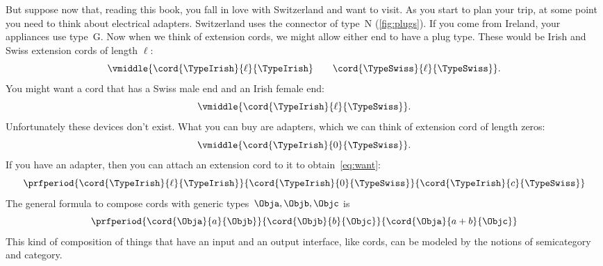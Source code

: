 But suppose now that, reading this book, you fall in love with Switzerland and want to visit.
As you start to plan your trip, at some point you need to think about electrical adapters.
Switzerland uses the connector of type~N (\cref{fig:plugs}).
If you come from Ireland, your appliances use type~G.
Now when we think of extension cords, we might allow either end to have a plug type.
%
These would be Irish and Swiss extension cords of length $\ell$:
%
\begin{equation}
    \label{eq:irish-swiss}
    \vmiddle{\cord{\TypeIrish}{\ell}{\TypeIrish} \qquad \cord{\TypeSwiss}{\ell}{\TypeSwiss}}.
\end{equation}
%
You might want a cord that has a Swiss male end and an Irish female end:
%
\begin{equation}
    \label{eq:want}
    \vmiddle{\cord{\TypeIrish}{\ell}{\TypeSwiss}}.
\end{equation}
%
Unfortunately these devices don't exist.
What you can buy are adapters, which we can think of extension cord of length zeros:
\begin{equation}
    \vmiddle{\cord{\TypeIrish}{0}{\TypeSwiss}}.
\end{equation}
%
If you have an adapter, then you can attach an extension cord to it to obtain~\cref{eq:want}:
%
\begin{equation}
    \label{eq:irish-swiss-result}
    \prfperiod{
        \cord{\TypeIrish}{\ell}{\TypeIrish}
    }{
        \cord{\TypeIrish}{0}{\TypeSwiss}
    }{
        \cord{\TypeIrish}{c}{\TypeSwiss}
    }
\end{equation}
%
The general formula to compose cords with generic types~$\Obja, \Objb, \Objc$ is
%
\begin{equation}
    \label{eq:cords-generic}
    \prfperiod{
        \cord{\Obja}{a}{\Objb}
    }{
        \cord{\Objb}{b}{\Objc}
    }{
        \cord{\Obja}{a+b}{\Objc}
    }
\end{equation}
%
This kind of composition of things that have an input and an output interface, like cords, can be modeled by the notions of semicategory and category.


%
%
%


